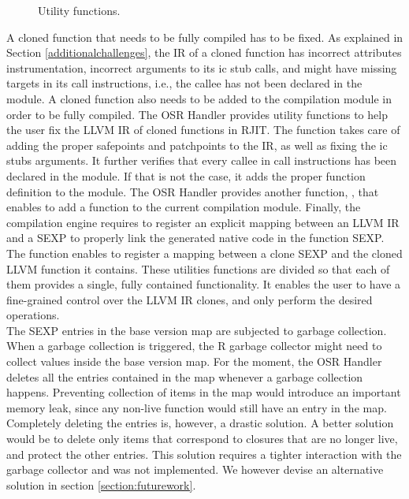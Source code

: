 \begin{figure}[h]
\caption{Utility functions.}
\label{fig:utilityfunctions}
\end{figure}

A cloned function that needs to be fully compiled has to be fixed.
As explained in Section \ref{additionalchallenges}, the IR of a cloned function has incorrect attributes instrumentation, incorrect arguments to its ic stub calls, and might have missing targets in its call instructions, i.e., the callee has not been declared in the module.
A cloned function also needs to be added to the compilation module in order to be fully compiled.
The OSR Handler provides utility functions to help the user fix the LLVM IR of cloned functions in RJIT. 
The  function takes care of adding the proper safepoints and patchpoints to the IR, as well as fixing the ic stubs arguments.
It further verifies that every callee in call instructions has been declared in the module. 
If that is not the case, it adds the proper function definition to the module.
The OSR Handler provides another function, , that enables to add a function to the current compilation module.
Finally, the compilation engine requires to register an explicit mapping between an LLVM IR and a SEXP to properly link the generated native code in the function SEXP.
The  function enables to register a mapping between a clone SEXP and the cloned LLVM function it contains.
These utilities functions are divided so that each of them provides a single, fully contained functionality. 
It enables the user to have a fine-grained control over the LLVM IR clones, and only perform the desired operations.\\

The SEXP entries in the base version map are subjected to garbage collection.
When a garbage collection is triggered, the R garbage collector might need to collect values inside the base version map.
For the moment, the OSR Handler deletes all the entries contained in the map whenever a garbage collection happens.
Preventing collection of items in the map would introduce an important memory leak, since any non-live function would still have an entry in the map.
Completely deleting the entries is, however, a drastic solution.
A better solution would be to delete only items that correspond to closures that are no longer live, and protect the other entries.
This solution requires a tighter interaction with the garbage collector and was not implemented. 
We however devise an alternative solution in section \ref{section:futurework}.\\

